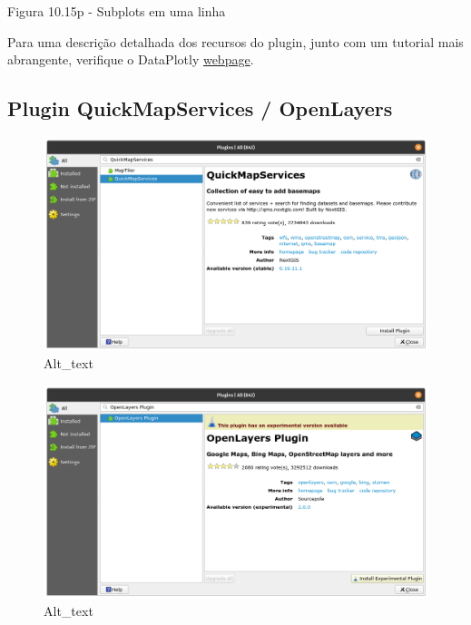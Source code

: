 \documentclass[
  portuguese,
]{krantz}
\begin{document}
Figura 10.15p - Subplots em uma linha

Para uma descrição detalhada dos recursos do plugin, junto com um tutorial mais abrangente, verifique o DataPlotly \href{https:\%20//\%20github\%20.com\%20/\%20ghtmtt\%20/\%20DataPlotly}{webpage}.

\hypertarget{plugin-quickmapservices-openlayers}{%
\subsection{\texorpdfstring{\textbf{Plugin QuickMapServices / OpenLayers}}{Plugin QuickMapServices / OpenLayers}}\label{plugin-quickmapservices-openlayers}}

\begin{figure}
\centering
\includegraphics{media/modulo10/fig1016_a1.png}
\caption{Alt\_text}
\end{figure}

\begin{figure}
\centering
\includegraphics{media/modulo10/fig1016_a2.png}
\caption{Alt\_text}
\end{figure}
\end{document}
